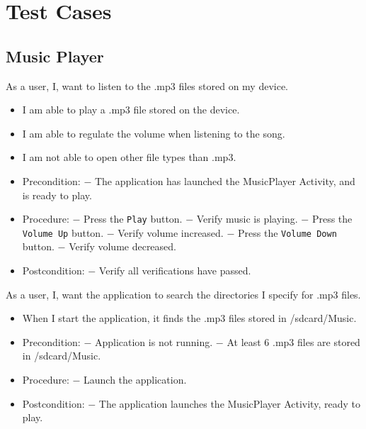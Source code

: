 \section{Test Cases}
\subsection{Music Player}
{As a user, I, want to listen to the .mp3 files stored on my device.}
{\begin{itemize}
\item I am able to play a .mp3 file stored on the device.
\item I am able to regulate the volume when listening to the song.
\item I am not able to open other file types than .mp3.
\end{itemize}}
{\begin{itemize}
\item Precondition: 
\subitem $-$ The application has launched the MusicPlayer Activity, and is ready to play.

\item Procedure:
\subitem $-$ Press the \texttt{Play} button.
\subitem $-$ Verify music is playing.
\subitem $-$ Press the \texttt{Volume Up} button.
\subitem $-$ Verify volume increased.
\subitem $-$ Press the \texttt{Volume Down} button.
\subitem $-$ Verify volume decreased.

\item Postcondition:
\subitem $-$ Verify all verifications have passed.
\end{itemize}}


{As a user, I, want the application to search the directories I specify for .mp3 files.}
{\begin{itemize}
\item When I start the application, it finds the .mp3 files stored in /sdcard/Music.
\end{itemize}}
{\begin{itemize}
\item Precondition: 
\subitem $-$ Application is not running.
\subitem $-$ At least 6 .mp3 files are stored in /sdcard/Music.

\item Procedure:
\subitem $-$ Launch the application.

\item Postcondition:
\subitem $-$ The application launches the MusicPlayer Activity, ready to play.
\end{itemize}}


